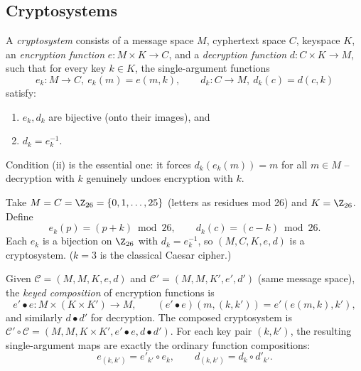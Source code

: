 \subsection{Cryptosystems}
\label{sec:2-10}

\begin{definition}[Cryptosystem]
A \emph{cryptosystem} consists of a message space $M$, cyphertext space $C$, keyspace $K$, an \emph{encryption function} $e: M \times K \to C$, and a \emph{decryption function} $d: C \times K \to M$, such that for every key $k \in K$, the single-argument functions
\[
e_k : M \to C,\ e_k(m) = e(m,k), \qquad d_k : C \to M,\ d_k(c) = d(c,k)
\]
satisfy:
\begin{enumerate}[label=(\roman*)]
    \item $e_k, d_k$ are bijective (onto their images), and
    \item $d_k = e_k^{-1}$.
\end{enumerate}
\end{definition}

\begin{note}
Condition (ii) is the essential one: it forces $d_k(e_k(m)) = m$ for all $m \in M$ -- decryption with $k$ genuinely undoes encryption with $k$.
\end{note}

\begin{example}
Take $M = C = \Z_{26} = \{0,1,\dots,25\}$ (letters as residues mod 26) and $K = \Z_{26}$. Define
\[
e_k(p) = (p+k) \bmod 26, \qquad d_k(c) = (c-k) \bmod 26.
\]
Each $e_k$ is a bijection on $\Z_{26}$ with $d_k = e_k^{-1}$, so $(M,C,K,e,d)$ is a cryptosystem. ($k=3$ is the classical Caesar cipher.)
\end{example}

\begin{definition}
Given $\mathcal{C} = (M,M,K,e,d)$ and $\mathcal{C}' = (M,M,K',e',d')$ (same message space), the \emph{keyed composition} of encryption functions is
\[
e' \bullet e : M \times (K \times K') \to M, \qquad (e' \bullet e)(m,(k,k')) = e'(e(m,k),k'),
\]
and similarly $d \bullet d'$ for decryption. The composed cryptosystem is $\mathcal{C}' \circ \mathcal{C} = (M,M,K\times K', e'\bullet e, d\bullet d')$. For each key pair $(k,k')$, the resulting single-argument maps are exactly the ordinary function compositions:
\[
e_{(k,k')} = e'_{k'} \circ e_k, \qquad d_{(k,k')} = d_k \circ d'_{k'}.
\]
\end{definition}

